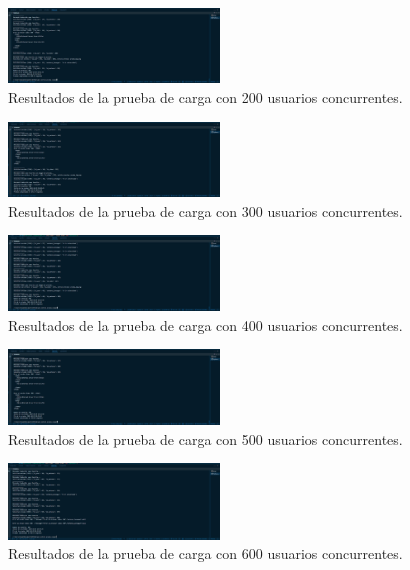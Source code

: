 \begin{figure}[H]
    \centering
    \includegraphics[width=0.5\textwidth]{figuras/pruebaCarga200U.png}
    \caption{Resultados de la prueba de carga con 200 usuarios concurrentes.}
    \label{fig:pruebaCarga200U}
\end{figure}

\begin{figure}[H]
    \centering
    \includegraphics[width=0.5\textwidth]{figuras/pruebaCarga300U.png}
    \caption{Resultados de la prueba de carga con 300 usuarios concurrentes.}
    \label{fig:pruebaCarga300U}
\end{figure}

\begin{figure}[H]
    \centering
    \includegraphics[width=0.5\textwidth]{figuras/pruebaCarga400U.png}
    \caption{Resultados de la prueba de carga con 400 usuarios concurrentes.}
    \label{fig:pruebaCarga400U}
\end{figure}

\begin{figure}[H]
    \centering
    \includegraphics[width=0.5\textwidth]{figuras/pruebaCarga500U.png}
    \caption{Resultados de la prueba de carga con 500 usuarios concurrentes.}
    \label{fig:pruebaCarga500U}
\end{figure}

\begin{figure}[H]
    \centering
    \includegraphics[width=0.5\textwidth]{figuras/pruebaCarga600U.png}
    \caption{Resultados de la prueba de carga con 600 usuarios concurrentes.}
    \label{fig:pruebaCarga600U}
\end{figure}

